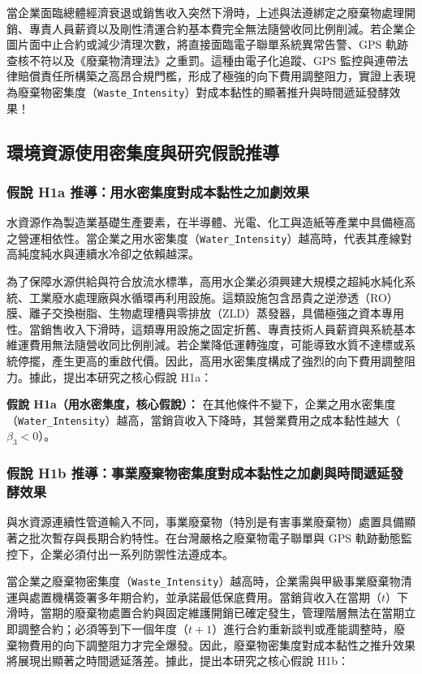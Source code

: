\documentclass[12pt,a4paper]{article}
\begin{document}
當企業面臨總體經濟衰退或銷售收入突然下滑時，上述與法遵綁定之廢棄物處理開銷、專責人員薪資以及剛性清運合約基本費完全無法隨營收同比例削減。若企業企圖片面中止合約或減少清理次數，將直接面臨電子聯單系統異常告警、GPS 軌跡查核不符以及《廢棄物清理法》之重罰。這種由電子化追蹤、GPS 監控與連帶法律賠償責任所構築之高昂合規門檻，形成了極強的向下費用調整阻力，實證上表現為廢棄物密集度（\texttt{Waste\_Intensity}）對成本黏性的顯著推升與時間遞延發酵效果！

\subsection{環境資源使用密集度與研究假說推導}

\subsubsection{假說 H1a 推導：用水密集度對成本黏性之加劇效果}

水資源作為製造業基礎生產要素，在半導體、光電、化工與造紙等產業中具備極高之營運相依性。當企業之用水密集度（\texttt{Water\_Intensity}）越高時，代表其產線對高純度純水與連續水冷卻之依賴越深。

為了保障水源供給與符合放流水標準，高用水企業必須興建大規模之超純水純化系統、工業廢水處理廠與水循環再利用設施。這類設施包含昂貴之逆滲透（RO）膜、離子交換樹脂、生物處理槽與零排放（ZLD）蒸發器，具備極強之資本專用性。當銷售收入下滑時，這類專用設施之固定折舊、專責技術人員薪資與系統基本維運費用無法隨營收同比例削減。若企業降低運轉強度，可能導致水質不達標或系統停擺，產生更高的重啟代價。因此，高用水密集度構成了強烈的向下費用調整阻力。據此，提出本研究之核心假說 H1a：

\textbf{假說 H1a（用水密集度，核心假說）：} 在其他條件不變下，企業之用水密集度（\texttt{Water\_Intensity}）越高，當銷貨收入下降時，其營業費用之成本黏性越大（$\beta_3 < 0$）。

\subsubsection{假說 H1b 推導：事業廢棄物密集度對成本黏性之加劇與時間遞延發酵效果}

與水資源連續性管道輸入不同，事業廢棄物（特別是有害事業廢棄物）處置具備顯著之批次暫存與長期合約特性。在台灣嚴格之廢棄物電子聯單與 GPS 軌跡動態監控下，企業必須付出一系列防禦性法遵成本。

當企業之廢棄物密集度（\texttt{Waste\_Intensity}）越高時，企業需與甲級事業廢棄物清運與處置機構簽署多年期合約，並承諾最低保底費用。當銷貨收入在當期（$t$）下滑時，當期的廢棄物處置合約與固定維護開銷已確定發生，管理階層無法在當期立即調整合約；必須等到下一個年度（$t+1$）進行合約重新談判或產能調整時，廢棄物費用的向下調整阻力才完全爆發。因此，廢棄物密集度對成本黏性之推升效果將展現出顯著之時間遞延落差。據此，提出本研究之核心假說 H1b：
\end{document}
